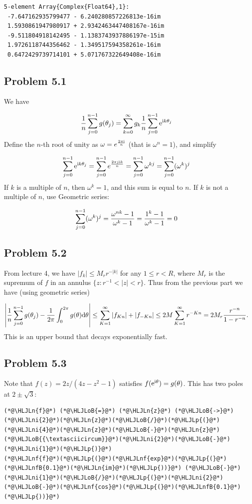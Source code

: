 \documentclass[12pt,a4paper]{article}
\newcommand{\HLJLn}[1]{#1}
\newcommand{\HLJLnf}[1]{\textcolor[RGB]{66,102,213}{#1}}
\newcommand{\HLJLnfB}[1]{\textcolor[RGB]{59,151,46}{#1}}
\newcommand{\HLJLni}[1]{\textcolor[RGB]{59,151,46}{#1}}
\newcommand{\HLJLoB}[1]{\textcolor[RGB]{102,102,102}{\textbf{#1}}}
\newcommand{\HLJLp}[1]{#1}
\def\D{ {\rm d} }
\def\I{ {\rm i} }
\def\E{ {\rm e} }
\begin{document}
\begin{lstlisting}
5-element Array{Complex{Float64},1}:
 -7.647162935799477 - 6.240280857226813e-16im 
 1.5930861947980917 + 2.9342463447408167e-16im
 -9.511804918142495 - 1.1383743937886197e-15im
 1.9726118744356462 - 1.349517594358261e-16im 
 0.6472429739714101 + 5.071767322649408e-16im
\end{lstlisting}


\subsection{Problem 5.1}
We have 

\[
{1 \over n} \sum_{j=0}^{n-1} g(\theta_j) = \sum_{k=0}^\infty g_k  {1 \over n} \sum_{j=0}^{n-1} \E^{\I k \theta_j}
\]
Define the $n$-th root of unity as $\omega = e^{2 \pi \I  \over n}$ (that is $\omega^n = 1$), and simplify 

\[
\sum_{j=0}^{n-1} \E^{\I k \theta_j} =\sum_{j=0}^{n-1} e^{{2 \pi j \I k \over n}} =\sum_{j=0}^{n-1} \omega^{kj}= \sum_{j=0}^{n-1} (\omega^k)^j
\]
If $k$ is a multiple of $n$, then $\omega^k = 1$, and this sum is equal to $n$. If $k$ is not a multiple of $n$, use Geometric series:

\[
\sum_{j=0}^{n-1} (\omega^k)^j = {\omega^{nk} - 1 \over \omega^k -1} = {1^k - 1 \over \omega^k-1} = 0
\]
\subsection{Problem 5.2}
From lecture 4, we have $|f_k| \leq M_r r^{-|k|}$ for any $1 \leq r < R$, where $M_r$ is the supremum of $f$ in an annulus $\{ z : r^{-1} < |z| < r \}$. Thus from the previous part we have (using geometric series)

\[
\left| {1 \over n} \sum_{j=0}^{n-1} g(\theta_j)  - { 1\over 2 \pi}	 \int_0^{2\pi} g(\theta) \D \theta \right| \leq \sum_{K=1}^\infty |f_{Kn}| + |f_{-Kn}| \leq 2M \sum_{K=1}^\infty r^{-Kn} = 2M_r {r^{-n} \over 1 - r^{-n}}.
\]
This is an upper bound that  decays exponentially fast. 

\subsection{Problem 5.3}
Note that $f(z) = 2 z/(4z - z^2 - 1)$ satisfies $f(\E^{\I \theta}) = g(\theta)$. This has two poles at $2 \pm \sqrt 3$:


\begin{lstlisting}
(*@\HLJLn{f}@*) (*@\HLJLoB{=}@*) (*@\HLJLn{z}@*) (*@\HLJLoB{->}@*) (*@\HLJLni{2}@*)(*@\HLJLn{z}@*)(*@\HLJLoB{/}@*)(*@\HLJLp{(}@*)(*@\HLJLni{4}@*)(*@\HLJLn{z}@*)(*@\HLJLoB{-}@*)(*@\HLJLn{z}@*)(*@\HLJLoB{{\textasciicircum}}@*)(*@\HLJLni{2}@*)(*@\HLJLoB{-}@*)(*@\HLJLni{1}@*)(*@\HLJLp{)}@*)
(*@\HLJLnf{f}@*)(*@\HLJLp{(}@*)(*@\HLJLnf{exp}@*)(*@\HLJLp{(}@*)(*@\HLJLnfB{0.1}@*)(*@\HLJLn{im}@*)(*@\HLJLp{))}@*) (*@\HLJLoB{-}@*) (*@\HLJLni{1}@*)(*@\HLJLoB{/}@*)(*@\HLJLp{(}@*)(*@\HLJLni{2}@*)(*@\HLJLoB{-}@*)(*@\HLJLnf{cos}@*)(*@\HLJLp{(}@*)(*@\HLJLnfB{0.1}@*)(*@\HLJLp{))}@*)
\end{lstlisting}
\end{document}
